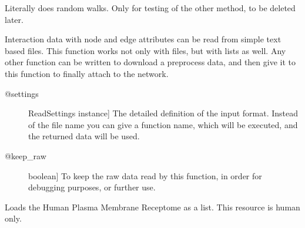 \documentclass[letterpaper,10pt,english]{sphinxmanual}
\begin{document}
\begin{fulllineitems}

\begin{fulllineitems}
\label{\detokenize{main:pypath.main.PyPath.random_walk_with_return2}}
Literally does random walks.
Only for testing of the other method, to be deleted later.

\end{fulllineitems}


\begin{fulllineitems}
\label{\detokenize{main:pypath.main.PyPath.read_data_file}}
Interaction data with node and edge attributes can be read
from simple text based files. This function works not only
with files, but with lists as well. Any other function can
be written to download a preprocess data, and then give it
to this function to finally attach to the network.
\begin{description}
\item[{@settings}] \leavevmode{[}ReadSettings instance{]}
The detailed definition of the input format. Instead of
the file name you can give a function name, which will
be executed, and the returned data will be used.

\item[{@keep\_raw}] \leavevmode{[}boolean{]}
To keep the raw data read by this function, in order for
debugging purposes, or further use.

\end{description}

\end{fulllineitems}


\begin{fulllineitems}
\label{\detokenize{main:pypath.main.PyPath.receptors_list}}
Loads the Human Plasma Membrane Receptome as a list.
This resource is human only.

\end{fulllineitems}


\end{fulllineitems}
\end{document}
